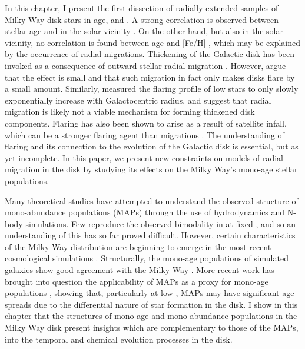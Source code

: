  In this chapter, I present the first dissection of radially extended samples of Milky Way disk stars in age, \feh{} and \afe{}. A strong correlation is observed between stellar age and \afe{} in the solar vicinity \citep{2013A&A...560A.109H}. On the other hand, but also in the solar vicinity, no correlation is found between age and [Fe/H] \citep[e.g.][]{1993A&A...275..101E,2004A&A...418..989N}, which may be explained by the occurrence of radial migrations. Thickening of the Galactic disk has been invoked as a consequence of outward stellar radial migration \citep[e.g.][]{2009MNRAS.399.1145S}. However, \citet{2012A&A...548A.127M} argue that the effect is small and that such migration in fact only makes disks flare by a small amount. Similarly, \citet{2016ApJ...823...30B} measured the flaring profile of low \afe{} stars to only slowly exponentially increase with Galactocentric radius, and suggest that radial migration is likely not a viable mechanism for forming thickened disk components. Flaring has also been shown to arise as a result of satellite infall, which can be a stronger flaring agent than migrations \citep[e.g.][]{2009ApJ...707L...1B}. The understanding of flaring and its connection to the evolution of the Galactic disk is essential, but as yet incomplete. In this paper, we present new constraints on models of radial migration in the disk by studying its effects on the Milky Way's mono-age stellar populations. 

 Many theoretical studies have attempted to understand the observed structure of mono-abundance populations (MAPs) through the use of hydrodynamics and N-body simulations. Few reproduce the observed bimodality in \afe{} at fixed \feh{}, and so an understanding of this has so far proved difficult. However, certain characteristics of the Milky Way \afe{} distribution are beginning to emerge in the most recent cosmological simulations  \citep{2016arXiv160804133M}. Structurally, the mono-age populations of simulated galaxies show good agreement with the Milky Way \citep[e.g.][]{2013MNRAS.436..625S,2013ApJ...773...43B,2014MNRAS.442.2474M,2014MNRAS.443.2452M}. More recent work has brought into question the applicability of MAPs as a proxy for mono-age populations \citep{2017ApJ...834...27M}, showing that, particularly at low \afe{}, MAPs may have significant age spreads due to the differential nature of star formation in the disk. I show in this chapter that the structures of mono-age and mono-abundance populations in the Milky Way disk present insights which are complementary to those of the MAPs, into the temporal and chemical evolution processes in the disk.

